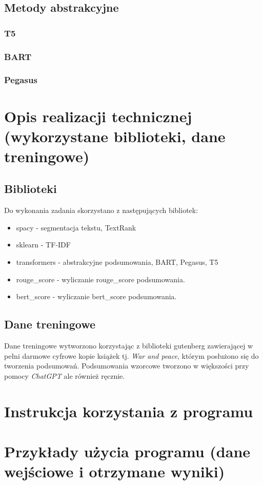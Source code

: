\documentclass{article}
\begin{document}
\subsection{Metody abstrakcyjne}

\subsubsection{T5}
\subsubsection{BART}
\subsubsection{Pegasus}

\section{Opis realizacji technicznej (wykorzystane biblioteki, dane treningowe)}
\subsection{Biblioteki}
Do wykonania zadania skorzystano z następujących bibliotek:
\begin{itemize}
	\item spacy - segmentacja tekstu, TextRank
	\item sklearn - TF-IDF
	\item transformers - abstrakcyjne podsumowania, BART, Pegasus, T5
	\item rouge\_score - wyliczanie rouge\_score podsumowania.
	\item bert\_score - wyliczanie bert\_score podsumowania.
\end{itemize}
\subsection{Dane treningowe}
Dane treningowe wytworzono korzystając z biblioteki gutenberg \cite{gutenberg}
zawierającej w pełni darmowe cyfrowe kopie książek tj. \textit{War and peace}, którym
posłużono się do tworzenia podsumowań. Podsumowania wzorcowe tworzono w większości przy pomocy
\textit{ChatGPT} ale również ręcznie.

\section{Instrukcja korzystania z programu}
\section{Przykłady użycia programu (dane wejściowe i otrzymane wyniki)}



\end{document}
